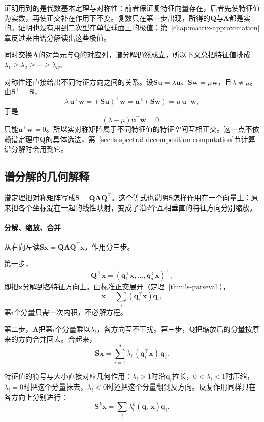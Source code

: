 证明用到的是代数基本定理与对称性：前者保证复特征向量存在，后者先使特征值为实数，再使正交补在作用下不变。复数只在第一步出现，所得的$\bm Q$与$\bm\Lambda$都是实的。证明也没有用到二次型在单位球面上的极值；第~\ref{chap:matrix-approximation}章反过来由谱分解读出这些极值。

同时交换$\bm\Lambda$的对角元与$\bm Q$的对应列，谱分解仍然成立，所以下文总把特征值排成$\lambda_1\geq\lambda_2\geq\cdots\geq\lambda_d$。

对称性还直接给出不同特征方向之间的关系。设$\bm S\bm u=\lambda\bm u$、$\bm S\bm w=\mu\bm w$，且$\lambda\neq\mu$。由$\bm S^\top=\bm S$，
\[
 \lambda\,\bm u^\top\bm w=(\bm S\bm u)^\top\bm w=\bm u^\top(\bm S\bm w)=\mu\,\bm u^\top\bm w ,
\]
于是
\[
 (\lambda-\mu)\bm u^\top\bm w=0 ,
\]
只能$\bm u^\top\bm w=0$。所以实对称矩阵属于不同特征值的特征空间互相正交。这一点不依赖谱定理中$\bm Q$的具体选法，第~\ref{sec:ls-spectral-decomposition-computation}节计算谱分解时会用到它。

\subsection{谱分解的几何解释}
\label{sec:ls-spectral-geometry}

谱定理把对称矩阵写成$\bm S=\bm Q\bm\Lambda\bm Q^\top$。这个等式也说明$\bm S$怎样作用在一个向量上：原来把各个坐标混在一起的线性映射，变成了沿$d$个互相垂直的特征方向分别缩放。

\paragraph{分解、缩放、合并}
从右向左读$\bm S\bm x=\bm Q\bm\Lambda\bm Q^\top\bm x$，作用分三步。

第一步，
\[
 \bm Q^\top\bm x=(\bm q_1^\top\bm x,\ldots,\bm q_d^\top\bm x)^\top,
\]
即把$\bm x$分解到各特征方向上。由标准正交展开（定理~\ref{thm:ls-parseval}），
\[
 \bm x=\sum_i(\bm q_i^\top\bm x)\bm q_i ,
\]
第$i$个分量只需一次内积，不必解方程。

第二步，$\bm\Lambda$把第$i$个分量乘以$\lambda_i$，各方向互不干扰。第三步，$\bm Q$把缩放后的分量按原来的方向合并回去。合起来，
\begin{equation}
 \bm S\bm x=\sum_{i=1}^d\lambda_i\,(\bm q_i^\top\bm x)\,\bm q_i .
 \label{eq:ls-spectral-action}
\end{equation}

特征值的符号与大小直接对应几何作用：$\lambda_i>1$时沿$\bm q_i$拉长，$0<\lambda_i<1$时压缩，$\lambda_i=0$时把这个分量抹去，$\lambda_i<0$时还把这个分量翻到反方向。反复作用同样只在各方向上分别进行：
\[
 \bm S^k\bm x=\sum_i\lambda_i^k(\bm q_i^\top\bm x)\bm q_i .
\]


